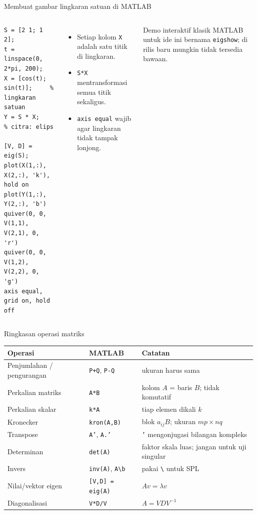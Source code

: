 \documentclass[aspectratio=169,11pt]{beamer}
\begin{document}
\begin{frame}[fragile]{Membuat gambar lingkaran satuan di MATLAB}
\begin{columns}[T]
\begin{lstlisting}[basicstyle=\ttfamily\footnotesize]
S = [2 1; 1 2];
t = linspace(0, 2*pi, 200);
X = [cos(t); sin(t)];     % lingkaran satuan
Y = S * X;                % citra: elips

[V, D] = eig(S);
plot(X(1,:), X(2,:), 'k'), hold on
plot(Y(1,:), Y(2,:), 'b')
quiver(0, 0, V(1,1), V(2,1), 0, 'r')
quiver(0, 0, V(1,2), V(2,2), 0, 'g')
axis equal, grid on, hold off
\end{lstlisting}
\small
\begin{itemize}
  \item Setiap kolom \texttt{X} adalah satu titik di lingkaran.
  \item \texttt{S*X} mentransformasi semua titik sekaligus.
  \item \texttt{axis equal} wajib agar lingkaran tidak tampak lonjong.
\end{itemize}
\vspace{0.3em}
\scriptsize Demo interaktif klasik MATLAB untuk ide ini bernama
\texttt{eigshow}; di rilis baru mungkin tidak tersedia bawaan.
\end{columns}
\end{frame}

\begin{frame}{Ringkasan operasi matriks}
\small
\renewcommand{\arraystretch}{1.25}
\centering
\begin{tabular}{l l l}
\toprule
Operasi & MATLAB & Catatan \\
\midrule
Penjumlahan / pengurangan & \texttt{P+Q}, \texttt{P-Q} & ukuran harus sama \\
Perkalian matriks & \texttt{A*B} & kolom $A$ = baris $B$; tidak komutatif \\
Perkalian skalar & \texttt{k*A} & tiap elemen dikali $k$ \\
Kronecker & \texttt{kron(A,B)} & blok $a_{ij}B$; ukuran $mp\times nq$ \\
Transpose & \texttt{A'}, \texttt{A.'} & \texttt{'} mengonjugasi bilangan kompleks \\
Determinan & \texttt{det(A)} & faktor skala luas; jangan untuk uji singular \\
Invers & \texttt{inv(A)}, \texttt{A\textbackslash b} & pakai \texttt{\textbackslash} untuk SPL \\
Nilai/vektor eigen & \texttt{[V,D] = eig(A)} & $Av=\lambda v$ \\
Diagonalisasi & \texttt{V*D/V} & $A = VDV^{-1}$ \\
\bottomrule
\end{tabular}
\end{frame}
\end{document}
